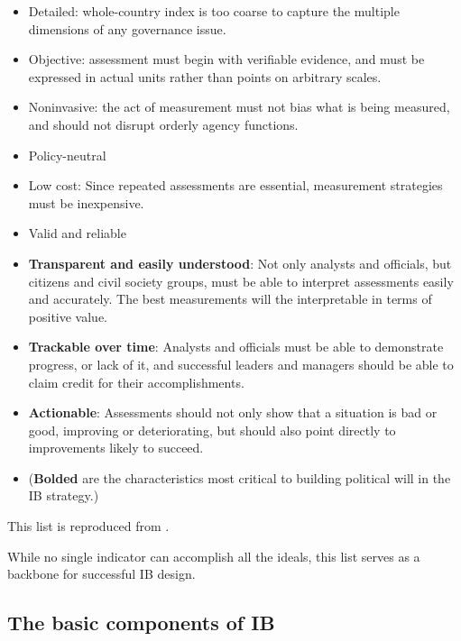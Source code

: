 \documentclass[12pt]{article}
\begin{document}
\begin{itemize}[noitemsep]
    \item{Detailed: whole-country index is too coarse to capture the multiple dimensions of any governance issue.}
    \item{Objective: assessment must begin with verifiable evidence, and must be expressed in actual units rather than points on arbitrary scales.}
    \item{Noninvasive: the act of measurement must not bias what is being measured, and should not disrupt orderly agency functions.}
    \item{Policy-neutral}
    \item{Low cost: Since repeated assessments are essential, measurement strategies must be inexpensive.}
    \item{Valid and reliable}
    \item{\textbf{Transparent and easily understood}: Not only analysts and officials, but citizens and civil society groups, must be able to interpret assessments easily and accurately. The best measurements will the interpretable in terms of positive value.}
    \item{\textbf{Trackable over time}: Analysts and officials must be able to demonstrate progress, or lack of it, and successful leaders and managers should be able to claim credit for their accomplishments.}
    \item{\textbf{Actionable}: Assessments should not only show that a situation is bad or good, improving or deteriorating, but should also point directly to improvements likely to succeed.}
    \item[] (\textbf{Bolded} are the characteristics most critical to building political will in the IB strategy.)
\end{itemize}

This list is reproduced from \citet{Johnston2010}.

While no single indicator can accomplish all the ideals, this list serves as a backbone for successful IB design.

\subsection{The basic components of IB} \label{sec:basicstrategy}
\end{document}
